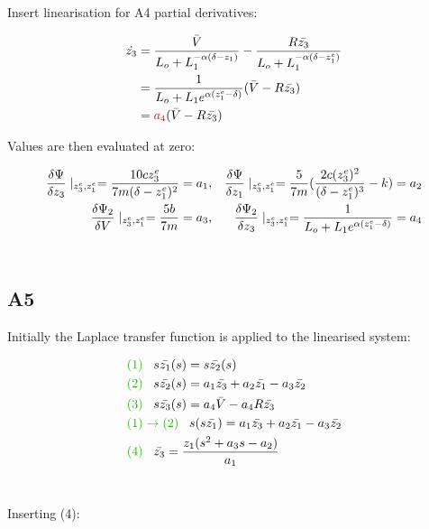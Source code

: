 \documentclass[a4paper,10pt,reqno]{amsart}
\numberwithin{equation}{section}
\begin{document}
\par Insert linearisation for A4 partial derivatives:

\begin{align}
    \dot{z_3}&=\frac{\bar{V}}{L_o+L_1^{-\alpha(\delta-z_1)}}-\frac{R\bar{z_3}}{L_o+L_1^{-\alpha(\delta-z_1^e)}}
    \notag\\
    &=\frac{1}{L_o+L_1e^{\alpha(z_1^e-\delta)}}(\bar{V}-R\bar{z_3})
    \notag\\
    &=\color{red}a_4\color{black}(\bar{V}-R\bar{z_3})
\end{align}

\par Values are then evaluated at zero:

\begin{align} %
    \frac{\delta\Psi}{\delta z_3}\mid_{z_3^e,z_1^e}=\frac{10cz_3^e}{7m(\delta-z_1^e)^2}=a_1,
    &&
    \frac{\delta\Psi}{\delta z_1}\mid_{z_3^e,z_1^e}=\frac{5}{7m}(\frac{2c(z_3^e)^2}{(\delta-z_1^e)^3}-k)=a_2
    \notag\\
    \frac{\delta\Psi_2}{\delta V}\mid_{z_3^e,z_1^e}=\frac{5b}{7m}=a_3,
    &&
    \frac{\delta\Psi_2}{\delta z_3}\mid_{z_3^e,z_1^e}=\frac{1}{L_o+L_1e^{\alpha(z_1^e-\delta)}}=a_4
    \label{eqn:a_4}
\end{align}
\\

\subsection{A5}\label{sec:A5} 

\par Initially the Laplace transfer function is applied to the linearised system:

\begin{align}
    &\color{darkGreen}(1)\color{black}\;\;\; s\bar{z_1}(s) {}={} s\bar{z_2}(s)
    \\
    &\color{darkGreen}(2)\color{black}\;\;\; s\bar{z_2}(s) {}={} a_1\bar{z_3}+a_2\bar{z_1}-a_3\bar{z_2}
    \\
    &\color{darkGreen}(3)\color{black}\;\;\; s\bar{z_3}(s) {}={} a_4\bar{V}-a_4R\bar{z_3}
    \\
    &\color{darkGreen}(1)\rightarrow(2)\color{black}\;\;\; s(s\bar{z_1}) {}={} a_1\bar{z_3}+a_2\bar{z_1}-a_3\bar{z_2}
    \notag\\
    &\color{darkGreen}(4)\color{black}\;\;\; \bar{z_3} {}={} \frac{z_1(s^2+a_3s-a_2)}{a_1}
    \notag
\end{align}
\\
\par Inserting \color{darkGreen}(4)\color{black}:
\end{document}
